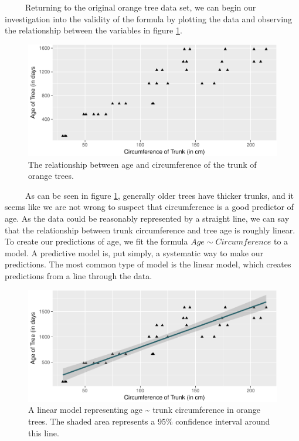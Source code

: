 \documentclass[12pt,twoside]{reedthesis}
\begin{document}
  ~~~~~Returning to the original orange tree data set, we can begin our
  investigation into the validity of the formula by plotting the data and
  observing the relationship between the variables in figure
  \ref{fig:figOrangeTree1}.
  
  \begin{figure}[H]
  
  {\centering \includegraphics{Thesis_files/figure-latex/figOrangeTree1-1} 
  
  }
  
  \caption{The relationship between age and circumference of the trunk of orange trees.}\label{fig:figOrangeTree1}
  \end{figure}
  
  ~~~~~As can be seen in figure \ref{fig:figOrangeTree1}, generally older
  trees have thicker trunks, and it seems like we are not wrong to suspect
  that circumference is a good predictor of age. As the data could be
  reasonably represented by a straight line, we can say that the
  relationship between trunk circumference and tree age is roughly linear.
  To create our predictions of age, we fit the formula
  \(Age \sim Circumference\) to a model. A predictive model is, put
  simply, a systematic way to make our predictions. The most common type
  of model is the linear model, which creates predictions from a line
  through the data.
  
  \begin{figure}[htbp]
  \centering
  \includegraphics{Thesis_files/figure-latex/unnamed-chunk-2-1.pdf}
  \caption{\label{fig:unnamed-chunk-2}\label{fig:OrangeLM}A linear model
  representing age \textasciitilde{} trunk circumference in orange trees.
  The shaded area represents a 95\% confidence interval around this line.}
  \end{figure}
  
\end{document}
